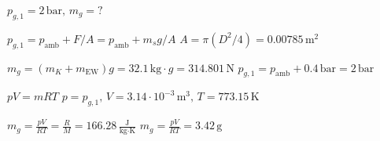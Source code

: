 \( p_{g,1} = 2 \, \text{bar}, \, m_{g} = ? \)  

\( p_{g,1} = p_{\text{amb}} + F/A = p_{\text{amb}} + m_{s} g/A \)  
\( A = \pi (D^2/4) = 0.00785 \, \text{m}^2 \)  

\( m_{g} = (m_{K} + m_{\text{EW}}) g = 32.1 \, \text{kg} \cdot g = 314.801 \, \text{N} \)  
\( p_{g,1} = p_{\text{amb}} + 0.4 \, \text{bar} = 2 \, \text{bar} \)  

\( p V = m R T \)  
\( p = p_{g,1}, \, V = 3.14 \cdot 10^{-3} \, \text{m}^3, \, T = 773.15 \, \text{K} \)  

\( m_{g} = \frac{p V}{R T} = \frac{R}{M} = 166.28 \, \frac{\text{J}}{\text{kg·K}} \)  
\( m_{g} = \frac{p V}{R T} = 3.42 \, \text{g} \)
